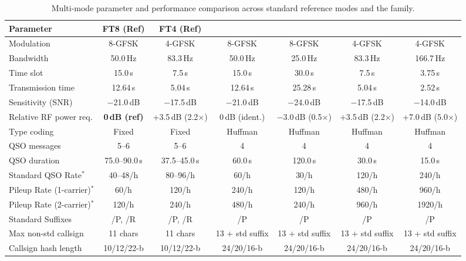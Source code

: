 \begin{table}[!t]
\centering
\caption{Multi-mode parameter and performance comparison across standard reference modes and the \LQ{} family.}
\label{tab:comparison}
\small
\setlength{\tabcolsep}{5pt}
\renewcommand{\arraystretch}{0.86}
\begin{tabular*}{\textwidth}{@{\extracolsep{\fill}}lcccccc@{}}
\toprule
\textbf{Parameter} & \textbf{FT8 (Ref)} & \textbf{FT4 (Ref)} & \textbf{\LQ8} & \textbf{\LQ16} & \textbf{\LQ4} & \textbf{\LQ2} \\
\midrule
Modulation            & 8-GFSK   & 4-GFSK   & 8-GFSK   & 8-GFSK   & 4-GFSK   & 4-GFSK \\
Bandwidth             & 50.0\,Hz & 83.3\,Hz & 50.0\,Hz & 25.0\,Hz & 83.3\,Hz & 166.7\,Hz \\
Time slot             & 15.0\,s  & 7.5\,s   & 15.0\,s  & 30.0\,s  & 7.5\,s   & 3.75\,s \\
Transmission time     & 12.64\,s & 5.04\,s  & 12.64\,s & 25.28\,s & 5.04\,s  & 2.52\,s \\
Sensitivity (SNR)     & $-$21.0\,dB& $-$17.5\,dB & $-$21.0\,dB& $-$24.0\,dB & $-$17.5\,dB & $-$14.0\,dB \\
Relative RF power req.& \textbf{0\,dB (ref)}& +3.5\,dB (2.2$\times$)& 0\,dB (ident.)& $-$3.0\,dB (0.5$\times$)& +3.5\,dB (2.2$\times$)& +7.0\,dB (5.0$\times$) \\
\midrule
Type coding           & Fixed    & Fixed    & Huffman  & Huffman  & Huffman  & Huffman \\
QSO messages          & 5--6     & 5--6     & 4        & 4        & 4        & 4 \\
QSO duration          & 75.0--90.0\,s & 37.5--45.0\,s & 60.0\,s & 120.0\,s & 30.0\,s & 15.0\,s \\
Standard QSO Rate$^*$ & 40--48/h & 80--96/h & 60/h     & 30/h     & 120/h    & 240/h \\
Pileup Rate (1-carrier)$^*$& 60/h & 120/h   & 240/h    & 120/h    & 480/h    & 960/h \\
Pileup Rate (2-carrier)$^*$& 120/h& 240/h   & 480/h    & 240/h    & 960/h    & 1920/h \\
\midrule
Standard Suffixes     & /P, /R   & /P, /R   & /P       & /P       & /P       & /P       \\
Max non-std callsign  & 11 chars & 11 chars & 13 + std suffix & 13 + std suffix & 13 + std suffix & 13 + std suffix \\
Callsign hash length  & 10/12/22-b& 10/12/22-b& 24/20/16-b& 24/20/16-b& 24/20/16-b& 24/20/16-b \\

\end{tabular*}
\end{table}
